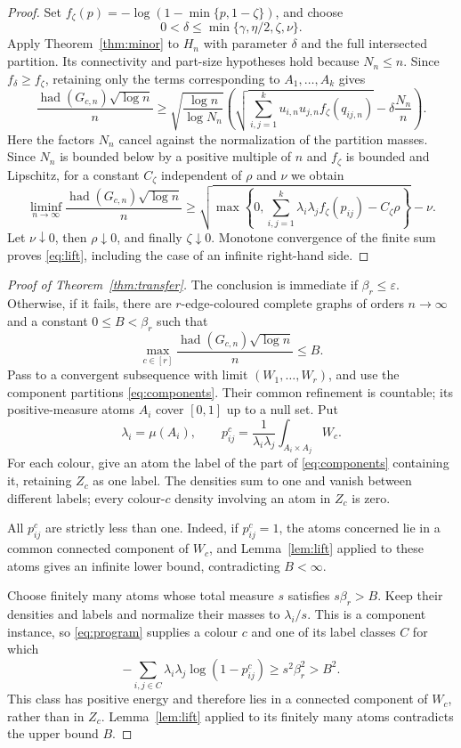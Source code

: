 \documentclass[11pt]{article}
\newcommand{\had}{\operatorname{had}}
\begin{document}
\begin{proof}
Set $f_\zeta(p)=-\log(1-\min\{p,1-\zeta\})$, and choose
\[
 0<\delta\leq\min\{\gamma,\eta/2,\zeta,\nu\}.
\]
Apply Theorem~\ref{thm:minor} to $H_n$ with parameter $\delta$ and the full
intersected partition. Its connectivity and part-size hypotheses hold
because $N_n\leq n$. Since $f_\delta\geq f_\zeta$, retaining only the
terms corresponding to $A_1,\ldots,A_k$ gives
\[
 \frac{\had(G_{c,n})\sqrt{\log n}}{n}
 \geq\sqrt{\frac{\log n}{\log N_n}}
 \left(\sqrt{\sum_{i,j=1}^k u_{i,n}u_{j,n}f_\zeta(q_{ij,n})}
             -\delta\frac{N_n}{n}\right).
\]
Here the factors $N_n$ cancel against the normalization of the partition
masses. Since $N_n$ is bounded below by a positive multiple of $n$ and
$f_\zeta$ is bounded and Lipschitz, for a constant $C_\zeta$ independent
of $\rho$ and $\nu$ we obtain
\[
 \liminf_{n\to\infty}\frac{\had(G_{c,n})\sqrt{\log n}}{n}
 \geq\sqrt{\max\left\{0,
            \sum_{i,j=1}^k \lambda_i \lambda_j f_\zeta(p_{ij})-C_\zeta\rho\right\}}
       -\nu.
\]
Let $\nu\downarrow0$, then $\rho\downarrow0$, and finally
$\zeta\downarrow0$. Monotone convergence of the finite sum proves
\eqref{eq:lift}, including the case of an infinite right-hand side.
\end{proof}

\begin{proof}[Proof of Theorem~\ref{thm:transfer}]
The conclusion is immediate if $\beta_r\leq\varepsilon$. Otherwise, if it
fails, there are $r$-edge-coloured complete graphs of orders $n\to\infty$
and a constant $0\leq B<\beta_r$ such that
\[
 \max_{c\in[r]}\frac{\had(G_{c,n})\sqrt{\log n}}{n}\leq B.
\]
Pass to a convergent subsequence with limit $(W_1,\ldots,W_r)$, and use
the component partitions \eqref{eq:components}. Their common refinement
is countable; its positive-measure atoms $A_i$ cover $[0,1]$ up to a null
set. Put
\[
 \lambda_i=\mu(A_i),\qquad
 p^c_{ij}=\frac{1}{\lambda_i \lambda_j}\int_{A_i\times A_j}W_c.
\]
For each colour, give an atom the label of the part of
\eqref{eq:components} containing it, retaining $Z_c$ as one label.
The densities sum to one and vanish between different labels; every
colour-$c$ density involving an atom in $Z_c$ is zero.

All $p^c_{ij}$ are strictly less than one. Indeed, if $p^c_{ij}=1$, the
atoms concerned lie in a common connected component of $W_c$, and
Lemma~\ref{lem:lift} applied to these atoms gives an infinite lower bound,
contradicting $B<\infty$.

Choose finitely many atoms whose total measure $s$ satisfies $s \beta_r>B$.
Keep their densities and labels and normalize their masses to $\lambda_i/s$.
This is a component instance, so \eqref{eq:program} supplies a colour $c$
and one of its label classes $C$ for which
\[
 -\sum_{i,j\in C}\lambda_i \lambda_j\log(1-p^c_{ij})
 \geq s^2\beta_r^2>B^2.
\]
This class has positive energy and therefore lies in a connected component
of $W_c$, rather than in $Z_c$. Lemma~\ref{lem:lift} applied to its finitely
many atoms contradicts the upper bound $B$.
\end{proof}
\end{document}
